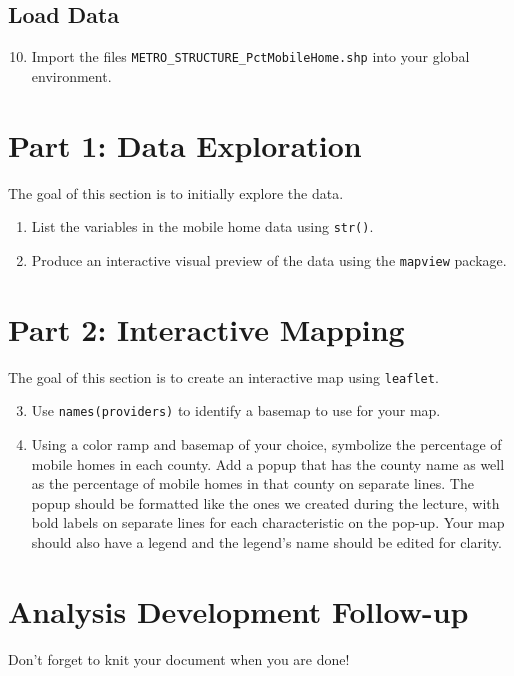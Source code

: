 \documentclass{tufte-handout}
\begin{document}
\vspace{3mm}
\subsection{Load Data}
\begin{enumerate}[label=\alph*.]
\setcounter{enumi}{9}
\item Import the files \texttt{METRO\_STRUCTURE\_PctMobileHome.shp} into your global environment.
\end{enumerate}

\vspace{5mm}
\section{Part 1: Data Exploration}
The goal of this section is to initially explore the data. 
\begin{enumerate}
\item List the variables in the mobile home data using \texttt{str()}.
\item Produce an interactive visual preview of the data using the \texttt{mapview} package.
\end{enumerate}

\vspace{5mm}
\section{Part 2: Interactive Mapping}
The goal of this section is to create an interactive map using \texttt{leaflet}. 
\begin{enumerate}
\setcounter{enumi}{2}
\item Use \texttt{names(providers)} to identify a basemap to use for your map.
\item Using a color ramp and basemap of your choice, symbolize the percentage of mobile homes in each county. Add a popup that has the county name as well as the percentage of mobile homes in that county on separate lines. The popup should be formatted like the ones we created during the lecture, with bold labels on separate lines for each characteristic on the pop-up. Your map should also have a legend and the legend's name should be edited for clarity. 
\end{enumerate}

\vspace{5mm}
\section{Analysis Development Follow-up}
Don't forget to knit your document when you are done!


\end{document}
